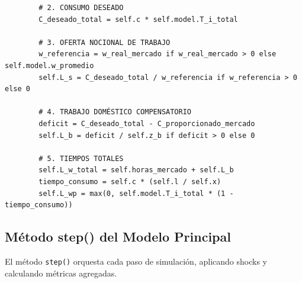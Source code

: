 \begin{verbatim}
        # 2. CONSUMO DESEADO
        C_deseado_total = self.c * self.model.T_i_total
        
        # 3. OFERTA NOCIONAL DE TRABAJO
        w_referencia = w_real_mercado if w_real_mercado > 0 else self.model.w_promedio
        self.L_s = C_deseado_total / w_referencia if w_referencia > 0 else 0
        
        # 4. TRABAJO DOMÉSTICO COMPENSATORIO
        deficit = C_deseado_total - C_proporcionado_mercado
        self.L_b = deficit / self.z_b if deficit > 0 else 0
            
        # 5. TIEMPOS TOTALES
        self.L_w_total = self.horas_mercado + self.L_b
        tiempo_consumo = self.c * (self.l / self.x)
        self.L_wp = max(0, self.model.T_i_total * (1 - tiempo_consumo))
\end{verbatim}

\subsection{Método step() del Modelo Principal}

El método \texttt{step()} orquesta cada paso de simulación, aplicando shocks y calculando métricas agregadas.

